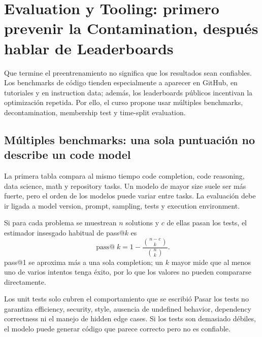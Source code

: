 \section{Evaluation y Tooling: primero prevenir la Contamination, después hablar de Leaderboards}

Que termine el preentrenamiento no significa que los resultados sean confiables. Los benchmarks de código tienden especialmente a aparecer en GitHub, en tutoriales y en instruction data; además, los leaderboards públicos incentivan la optimización repetida. Por ello, el curso propone usar múltiples benchmarks, decontamination, membership test y time-split evaluation.

\subsection{Múltiples benchmarks: una sola puntuación no describe un code model}

La primera tabla compara al mismo tiempo code completion, code reasoning, data science, math y repository tasks. Un modelo de mayor size suele ser más fuerte, pero el orden de los modelos puede variar entre tasks. La evaluación debe ir ligada a model version, prompt, sampling, tests y execution environment.



Si para cada problema se muestrean $n$ solutions y $c$ de ellas pasan los tests, el estimador insesgado habitual de pass@$k$ es
\[
\operatorname{pass@}k=1-\frac{\binom{n-c}{k}}{\binom{n}{k}}.
\]
pass@1 se aproxima más a una sola completion; un $k$ mayor mide que al menos uno de varios intentos tenga éxito, por lo que los valores no pueden compararse directamente.

\begin{warningbox}{Los unit tests solo cubren el comportamiento que se escribió}
Pasar los tests no garantiza efficiency, security, style, ausencia de undefined behavior, dependency correctness ni el manejo de hidden edge cases. Si los tests son demasiado débiles, el modelo puede generar código que parece correcto pero no es confiable.
\end{warningbox}


